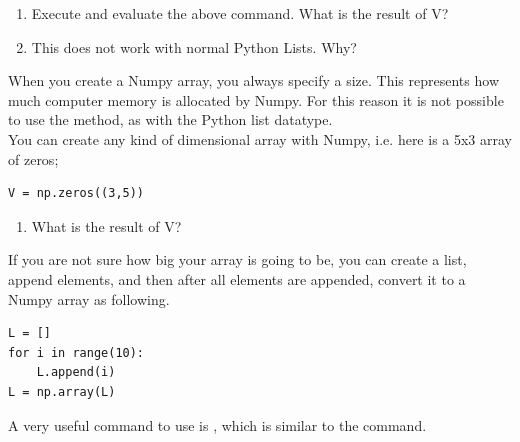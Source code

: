\documentclass{article}
\begin{document}
\begin{enumerate}[resume]
    \item Execute and evaluate the above command.
        What is the result of V?
    \item This does not work with normal Python Lists. Why? 
\end{enumerate}

When you create a Numpy array, you always specify a size.
This represents how much computer memory is allocated by Numpy.
For this reason it is not possible to use the  method, as with the Python list datatype.\\

You can create any kind of dimensional array with Numpy, i.e. here is a 5x3 array of zeros;

\begin{lstlisting}
V = np.zeros((3,5))
\end{lstlisting}

\begin{enumerate}[resume]
    \item What is the result of V?
\end{enumerate}

If you are not sure how big your array is going to be, you can create a list, append elements,
and then after all elements are appended, convert it to a Numpy array as following.

\begin{lstlisting}
L = []
for i in range(10):
    L.append(i)
L = np.array(L)
\end{lstlisting}

A very useful command to use is , which is similar to the  command.
\end{document}
